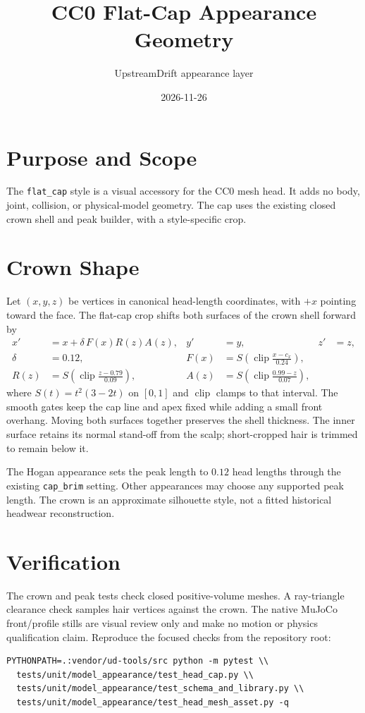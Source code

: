 \documentclass[11pt]{article}
\title{CC0 Flat-Cap Appearance Geometry}
\author{UpstreamDrift appearance layer}
\date{2026-11-26}
\begin{document}
\maketitle

\section{Purpose and Scope}
The \texttt{flat\_cap} style is a visual accessory for the CC0 mesh head. It
adds no body, joint, collision, or physical-model geometry. The cap uses the
existing closed crown shell and peak builder, with a style-specific crop.

\section{Crown Shape}
Let $(x,y,z)$ be vertices in canonical head-length coordinates, with $+x$
pointing toward the face. The flat-cap crop shifts both surfaces of the crown
shell forward by
\begin{align}
  x' &= x + \delta\,F(x)R(z)A(z), & y'&=y, & z'&=z, \\
  \delta &= 0.12, &
  F(x)&=S\!\left(\operatorname{clip}\frac{x-c_x}{0.24}\right),\\
  R(z)&=S\!\left(\operatorname{clip}\frac{z-0.79}{0.09}\right), &
  A(z)&=S\!\left(\operatorname{clip}\frac{0.99-z}{0.07}\right),
\end{align}
where $S(t)=t^2(3-2t)$ on $[0,1]$ and $\operatorname{clip}$ clamps to that
interval. The smooth gates keep the cap line and apex fixed while adding a
small front overhang. Moving both surfaces together preserves the shell
thickness. The inner surface retains its normal stand-off from the scalp;
short-cropped hair is trimmed to remain below it.

The Hogan appearance sets the peak length to $0.12$ head lengths through the
existing \texttt{cap\_brim} setting. Other appearances may choose any supported
peak length. The crown is an approximate silhouette style, not a fitted
historical headwear reconstruction.

\section{Verification}
The crown and peak tests check closed positive-volume meshes. A ray-triangle
clearance check samples hair vertices against the crown. The native MuJoCo
front/profile stills are visual review only and make no motion or physics
qualification claim. Reproduce the focused checks from the repository root:
\begin{verbatim}
PYTHONPATH=.:vendor/ud-tools/src python -m pytest \\
  tests/unit/model_appearance/test_head_cap.py \\
  tests/unit/model_appearance/test_schema_and_library.py \\
  tests/unit/model_appearance/test_head_mesh_asset.py -q
\end{verbatim}
\end{document}
